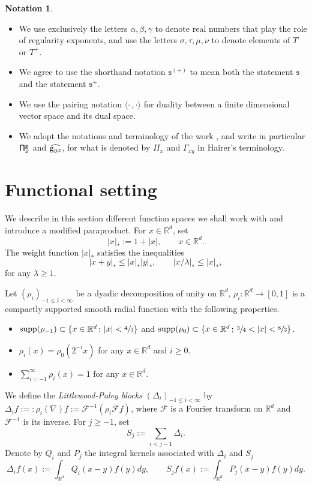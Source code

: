 \documentclass[JEP,XML,SOM,Unicode,published]{cedram}
\DeclareMathOperator{\supp}{supp}
\theoremstyle{plain}
\theoremstyle{definition}
\newtheorem*{notation*} {Notation}
\newcommand{\frks}{\mathfrak{s}}
\newcommand{\bbR}{\mathbb{R}}
\newcommand{\mcF}{\mathcal{F}}
\begin{document}
\skpt
\begin{notation*}
\begin{itemize}
\item
We use exclusively the letters $\alpha, \beta, \gamma$ to denote real numbers that play the role of regularity exponents, and use the letters $\sigma, \tau, \mu, \nu$ to denote elements of $T$ or $T^+$.

\item
We agree to use the shorthand notation $\frks^{(+)}$ to mean both the statement $\frks$ and the statement $\frks^+$.

\item
We use the pairing notation $\langle \cdot\,,\cdot\rangle$ for duality between a finite dimensional vector space and its dual space.

\item
We adopt the notations and terminology of the work \cite{BH}, and write in particular ${\sf \Pi}^{\sf g}_x$ and $\widehat{{\sf g}_{yx}}$, for what is denoted by $\Pi_x$ and $\Gamma_{xy}$ in Hairer's terminology.
\end{itemize}
\end{notation*}

\section{Functional setting}
\label{SectionFunctionalSetting}

We describe in this section different function spaces we shall work with and introduce a modified paraproduct. For $x\in\bbR^d$, set\vspace*{-3pt}
\[
|x|_* := 1+|x|,\qquad x\in\bbR^d.
\]
The weight function $|x|_*$ satisfies the inequalities
\[
|x+y|_*\le|x|_*|y|_*, \qquad |x/\lambda|_*\le|x|_*,
\]
for any $\lambda\ge1$.

Let $(\rho_i)_{-1\leq i<\infty}$ be a dyadic decomposition of unity on $\bbR^d$, \ie $\rho_i:\bbR^d\to[0,1]$ is a compactly supported smooth radial function with the following properties.
\begin{itemize}
\item $\supp (\rho_{-1})\subset\{x\in\bbR^d\,;\,|x|<\sfrac43\}$ and $\supp (\rho_0)\subset\{x\in\bbR^d\,;\,\sfrac34<|x|<\sfrac83\}$.
\item $\rho_i(x)=\rho_0(2^{-i}x)$ for any $x\in\bbR^d$ and $i\ge0$.
\item $\sum_{i=-1}^\infty\rho_i(x)=1$ for any $x\in\bbR^d$.
\end{itemize}
We define the \emph{Littlewood-Paley blocks} $(\Delta_i)_{-1\leq i<\infty}$ by $\Delta_if :=: \rho_i(\nabla)f:= \mcF^{-1}(\rho_i\mcF f)$, where $\mcF$ is a Fourier transform on $\bbR^d$ and $\mcF^{-1}$ is its inverse. For $j\geq -1$, set
\[
S_j := \sum_{i<j-1}\Delta_i.
\]
Denote by $Q_i$ and $P_j$ the integral kernels associated with $\Delta_i$ and $S_j$
\[
\Delta_if(x) := \int_{\bbR^d} Q_i(x-y)f(y)dy, \qquad S_jf(x) := \int_{\bbR^d} P_j(x-y)f(y)dy.
\]
\end{document}
